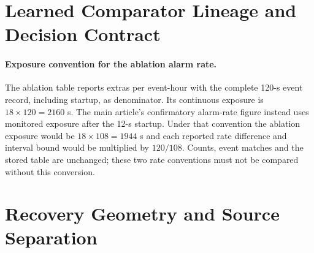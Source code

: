 \documentclass{ieeeaccess}
\begin{document}
\section{Learned Comparator Lineage and Decision Contract}
\label{app:comparator-lineage}





\FloatBarrier



\FloatBarrier






\paragraph{Exposure convention for the ablation alarm rate.}
The ablation table reports extras per event-hour with the complete
120-s event record, including startup, as denominator. Its continuous exposure is
$18\times120=2160$ s. The main article's confirmatory alarm-rate figure
instead uses monitored exposure after the 12-s startup. Under that
convention the ablation exposure would be $18\times108=1944$ s and each
reported rate difference and interval bound would be multiplied by
$120/108$. Counts, event matches and the stored table are unchanged;
these two rate conventions must not be compared without this conversion.




\FloatBarrier




\FloatBarrier






\FloatBarrier





\section{Recovery Geometry and Source Separation}


\end{document}
